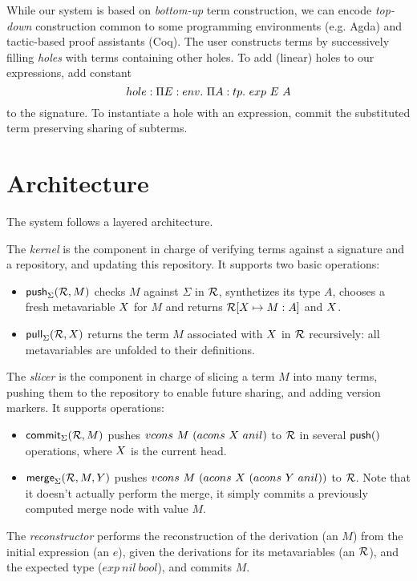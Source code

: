 \documentclass[9pt,authoryear]{sigplanconf}
\begin{document}
While our system is based on \emph{bottom-up} term construction, we
can encode \emph{top-down} construction common to some programming
environments (e.g. \textsf{Agda}) and tactic-based proof assistants
(\textsf{Coq}). The user constructs terms by
successively filling \emph{holes} with terms containing other
holes. To add (linear) holes to our expressions, add constant
$$ hole : \Pi{E}:{env}.\  \Pi{A}:{tp}.\  exp\ E\ A $$
to the signature. To instantiate a hole with an expression, commit the
substituted term preserving sharing of subterms.

\section{Architecture}

The system follows a layered architecture.

The \emph{kernel} is the component in charge of verifying terms
against a signature and a repository, and updating this repository. It
supports two basic operations:
\begin{itemize}
\item ${\rm\mathsf{push}}_{\Sigma}({\mathcal{R},M})$ checks $M$ against $\Sigma$
  in $\mathcal{R}$, synthetizes its type $A$, chooses a fresh metavariable
  $\mmeta$ for $M$ and returns $\mr[\mmeta\mapsto M:A]$ and $\mmeta$.
\item $\pfunction{pull}\Sigma{\mr, \mmeta}$ returns the term $M$
  associated with $\mmeta$ in $\mathcal{R}$ recursively: all metavariables are
  unfolded to their definitions.
\end{itemize}

The \emph{slicer} is the component in charge of slicing a term $M$
into many terms, pushing them to the repository to enable future
sharing, and adding version markers. It supports operations:
\begin{itemize}
\item ${\rm\mathsf{commit}}_{\Sigma}({\mathcal{R}, M})$ pushes $vcons\ M\ (acons\ \mmeta\
  anil)$ to $\mathcal{R}$ in several ${\rm\mathsf{push}}({})$ operations, where
  $\mmeta$ is the current head.
\item $\pfunction{merge}\Sigma{\mr, M, \mmmeta}$ pushes $vcons\ M\
  (acons\ \mmeta\ (acons\ \mmmeta\ anil))$ to $\mathcal{R}$. Note that it
  doesn't actually perform the merge, it simply commits a previously
  computed merge node with value $M$.
\end{itemize}

The \emph{reconstructor} performs the reconstruction of the derivation
(an $M$) from the initial expression (an $e$), given the
derivations for its metavariables (an $\mathcal{R}$), and the expected type
($exp\ nil\ bool$), and commits $M$.
\end{document}
